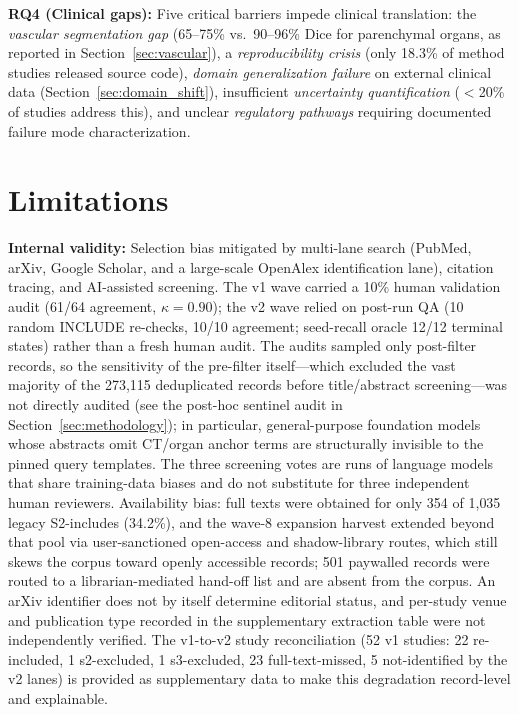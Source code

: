 \textbf{RQ4 (Clinical gaps):} Five critical barriers impede clinical translation: the \emph{vascular segmentation gap} (65--75\% vs.\ 90--96\% Dice for parenchymal organs, as reported in Section~\ref{sec:vascular}), a \emph{reproducibility crisis} (only 18.3\% of method studies released source code), \emph{domain generalization failure} on external clinical data (Section~\ref{sec:domain_shift}), insufficient \emph{uncertainty quantification} ($<$20\% of studies address this), and unclear \emph{regulatory pathways} requiring documented failure mode characterization.

\section{Limitations}
\label{sec:limitations}

\textbf{Internal validity:} Selection bias mitigated by multi-lane search (PubMed, arXiv, Google Scholar, and a large-scale OpenAlex identification lane), citation tracing, and AI-assisted screening. The v1 wave carried a 10\% human validation audit (61/64 agreement, $\kappa = 0.90$); the v2 wave relied on post-run QA (10 random INCLUDE re-checks, 10/10 agreement; seed-recall oracle 12/12 terminal states) rather than a fresh human audit. The audits sampled only post-filter records, so the sensitivity of the pre-filter itself---which excluded the vast majority of the 273{,}115 deduplicated records before title/abstract screening---was not directly audited (see the post-hoc sentinel audit in Section~\ref{sec:methodology}); in particular, general-purpose foundation models whose abstracts omit CT/organ anchor terms are structurally invisible to the pinned query templates. The three screening votes are runs of language models that share training-data biases and do not substitute for three independent human reviewers. Availability bias: full texts were obtained for only 354 of 1{,}035 legacy S2-includes (34.2\%), and the wave-8 expansion harvest extended beyond that pool via user-sanctioned open-access and shadow-library routes, which still skews the corpus toward openly accessible records; 501 paywalled records were routed to a librarian-mediated hand-off list and are absent from the corpus. An arXiv identifier does not by itself determine editorial status, and per-study venue and publication type recorded in the supplementary extraction table were not independently verified. The v1-to-v2 study reconciliation (52 v1 studies: 22 re-included, 1 s2-excluded, 1 s3-excluded, 23 full-text-missed, 5 not-identified by the v2 lanes) is provided as supplementary data to make this degradation record-level and explainable.

